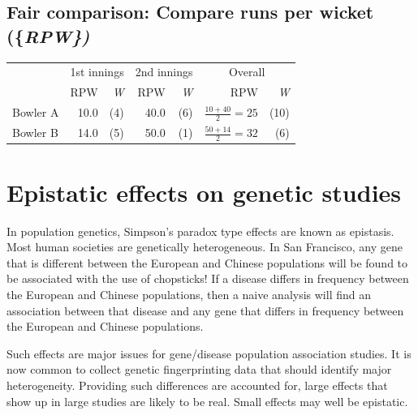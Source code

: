 \documentclass[
  10pt,
  b5paper]{book}
\begin{document}
\hypertarget{fair-comparison-compare-runs-per-wicket}{%
\subsection*{\texorpdfstring{Fair comparison: Compare runs per wicket (\{\em RPW\})}{Fair comparison: Compare runs per wicket (\{\})}}\label{fair-comparison-compare-runs-per-wicket}}

\vspace*{-5pt}

\begin{center}
\begin{tabular}{lrr||rr||rr}
\hline
 & \multicolumn{2}{c}{1st innings} & \multicolumn{2}{c}{2nd innings} &
\multicolumn{2}{c}{Overall} \\
\cline{2-3} \cline{4-5} \cline{6-7}
         &  RPW & {\em W}   &  RPW & {\em W} &
           RPW & {\em W} \\[4pt]
Bowler A &  10.0 & (4) & 40.0 & (6)  &
$\frac{10+40}{2} = 25$ & (10)\\[4pt]
Bowler B & 14.0 & (5)  & 50.0 & (1) & $\frac{50+14}{2} = 32$  &  (6)\\[4pt]
\cline{2-3} \cline{4-5} \cline{6-7}
\end{tabular}
\end{center}

\hypertarget{epistatic-effects-on-genetic-studies}{%
\section{Epistatic effects on genetic studies}\label{epistatic-effects-on-genetic-studies}}

In population genetics, Simpson's paradox type effects are known as
epistasis. Most human societies are genetically heterogeneous. In
San Francisco, any gene that is different between the European and
Chinese populations will be found to be associated with the use of
chopsticks! If a disease differs in frequency between the European
and Chinese populations, then a naive analysis will find an
association between that disease and any gene that differs in
frequency between the European and Chinese populations.

Such effects are major issues for gene/disease population
association studies. It is now common to collect genetic
fingerprinting data that should identify major heterogeneity.
Providing such differences are accounted for, large effects that show
up in large studies are likely to be real. Small effects may well be
epistatic.
\end{document}
